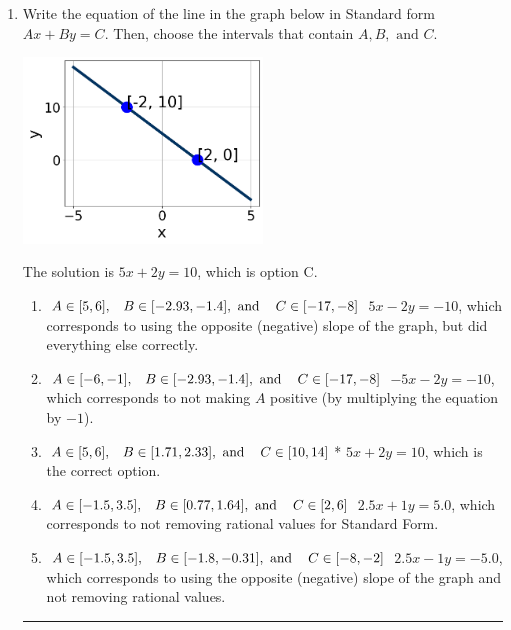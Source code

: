 \documentclass{extbook}[14pt]
\newcommand{\litem}[1]{\item#1\hspace*{-1cm}\rule{\textwidth}{0.4pt}}
\begin{document}
\begin{enumerate}\litem{
Write the equation of the line in the graph below in Standard form $Ax+By=C$. Then, choose the intervals that contain $A, B, \text{ and } C$.

\begin{center}
    \includegraphics[width=0.5\textwidth]{../Figures/linearGraphToStandardB.png}
\end{center}

The solution is \( 5x + 2y = 10 \), which is option C.\begin{enumerate}[label=\Alph*.]
\item \( A \in [5, 6], \hspace{3mm} B \in [-2.93, -1.4], \text{ and } \hspace{3mm} C \in [-17, -8] \) $5x - 2y = -10$, which corresponds to using the opposite (negative) slope of the graph, but did everything else correctly.
\item \( A \in [-6, -1], \hspace{3mm} B \in [-2.93, -1.4], \text{ and } \hspace{3mm} C \in [-17, -8] \) $-5x - 2y = -10$, which corresponds to not making $A$ positive (by multiplying the equation by $-1$).
\item \( A \in [5, 6], \hspace{3mm} B \in [1.71, 2.33], \text{ and } \hspace{3mm} C \in [10, 14] \)* $5x + 2y = 10$, which is the correct option.
\item \( A \in [-1.5, 3.5], \hspace{3mm} B \in [0.77, 1.64], \text{ and } \hspace{3mm} C \in [2, 6] \) $2.5x + 1y = 5.0$, which corresponds to not removing rational values for Standard Form.
\item \( A \in [-1.5, 3.5], \hspace{3mm} B \in [-1.8, -0.31], \text{ and } \hspace{3mm} C \in [-8, -2] \) $2.5x - 1y = -5.0$, which corresponds to using the opposite (negative) slope of the graph and not removing rational values.
\end{enumerate}

}
\end{enumerate}
\end{document}
